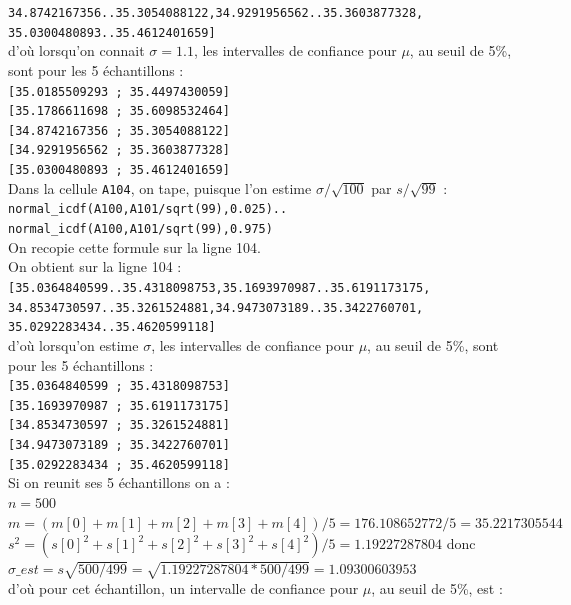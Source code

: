\documentclass[a4paper,11pt]{book}
\begin{document}
{\tt 34.8742167356..35.3054088122,34.9291956562..35.3603877328,}\\
{\tt 35.0300480893..35.4612401659]}\\
d'o\`u lorsqu'on connait $\sigma=1.1$, les intervalles de confiance pour $\mu$,
  au seuil de 5\%, sont pour les 5 \'echantillons :\\
{\tt  [35.0185509293 ; 35.4497430059]}\\
{\tt  [35.1786611698 ; 35.6098532464]}\\
{\tt  [34.8742167356 ;  35.3054088122]}\\
{\tt  [34.9291956562 ; 35.3603877328]}\\
{\tt  [35.0300480893 ; 35.4612401659]}\\
Dans la cellule {\tt A104}, on tape, puisque l'on estime $\sigma/\sqrt{100}$ 
par $s/\sqrt{99}$ :\\
{\tt normal\_icdf(A100,A101/sqrt(99),0.025)..}\\
{\tt normal\_icdf(A100,A101/sqrt(99),0.975)}\\
On recopie cette formule sur la ligne 104.\\
On obtient sur la ligne 104 :\\
{\tt [35.0364840599..35.4318098753,35.1693970987..35.6191173175,}\\
{\tt 34.8534730597..35.3261524881,34.9473073189..35.3422760701,}\\
{\tt 35.0292283434..35.4620599118]}\\
d'o\`u lorsqu'on estime $\sigma$, les intervalles de confiance pour $\mu$,
  au seuil de 5\%, sont pour les 5 \'echantillons :\\
{\tt [35.0364840599 ; 35.4318098753]}\\
{\tt [35.1693970987 ; 35.6191173175]}\\
{\tt [34.8534730597 ; 35.3261524881]}\\
{\tt [34.9473073189 ; 35.3422760701]}\\
{\tt [35.0292283434 ; 35.4620599118]}\\
Si on reunit ses 5 \'echantillons on a :\\
$n=500$\\
$m=(m[0]+m[1]+m[2]+m[3]+m[4])/5=176.108652772/5=35.2217305544$\\
$s^2=(s[0]^2+s[1]^2+s[2]^2+s[3]^2+s[4]^2)/5=1.19227287804$ donc \\
$\sigma\_est=s\sqrt{500/499}=\sqrt{1.19227287804*500/499}=1.09300603953$\\
d'o\`u pour cet 
\'echantillon, un intervalle de confiance pour $\mu$, au seuil de 5\%, est :
\end{document}
